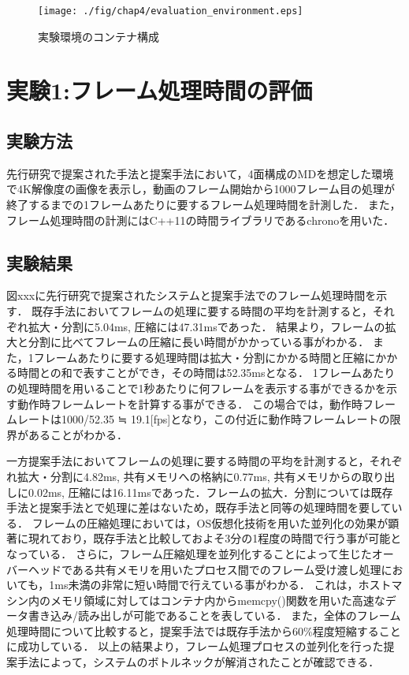 \begin{figure}[H]
    \hspace*{\fill}
    \texttt{[image: ./fig/chap4/evaluation\_environment.eps]}
    \hspace*{\fill}
    \caption{実験環境のコンテナ構成}
   \end{figure}

\section{実験1:フレーム処理時間の評価}

\subsection{実験方法}
先行研究で提案された手法と提案手法において，4面構成のMDを想定した環境で4K解像度の画像を表示し，動画のフレーム開始から1000フレーム目の処理が終了するまでの1フレームあたりに要するフレーム処理時間を計測した．
また，フレーム処理時間の計測にはC++11の時間ライブラリであるchronoを用いた．

\subsection{実験結果}
図xxxに先行研究で提案されたシステムと提案手法でのフレーム処理時間を示す．
既存手法においてフレームの処理に要する時間の平均を計測すると，それぞれ拡大・分割に5.04ms, 圧縮には47.31msであった．
結果より，フレームの拡大と分割に比べてフレームの圧縮に長い時間がかかっている事がわかる．
また，1フレームあたりに要する処理時間は拡大・分割にかかる時間と圧縮にかかる時間との和で表すことができ，その時間は52.35msとなる．
1フレームあたりの処理時間を用いることで1秒あたりに何フレームを表示する事ができるかを示す動作時フレームレートを計算する事ができる．
この場合では，動作時フレームレートは1000/52.35 ≒ 19.1[fps]となり，この付近に動作時フレームレートの限界があることがわかる．

一方提案手法においてフレームの処理に要する時間の平均を計測すると，それぞれ拡大・分割に4.82ms, 共有メモリへの格納に0.77ms, 共有メモリからの取り出しに0.02ms, 圧縮には16.11msであった．フレームの拡大．分割については既存手法と提案手法とで処理に差はないため，既存手法と同等の処理時間を要している．
フレームの圧縮処理においては，OS仮想化技術を用いた並列化の効果が顕著に現れており，既存手法と比較しておよそ3分の1程度の時間で行う事が可能となっている．
さらに，フレーム圧縮処理を並列化することによって生じたオーバーヘッドである共有メモリを用いたプロセス間でのフレーム受け渡し処理においても，1ms未満の非常に短い時間で行えている事がわかる．
これは，ホストマシン内のメモリ領域に対してはコンテナ内からmemcpy()関数を用いた高速なデータ書き込み/読み出しが可能であることを表している．
また，全体のフレーム処理時間について比較すると，提案手法では既存手法から60\%程度短縮することに成功している．
以上の結果より，フレーム処理プロセスの並列化を行った提案手法によって，システムのボトルネックが解消されたことが確認できる．

